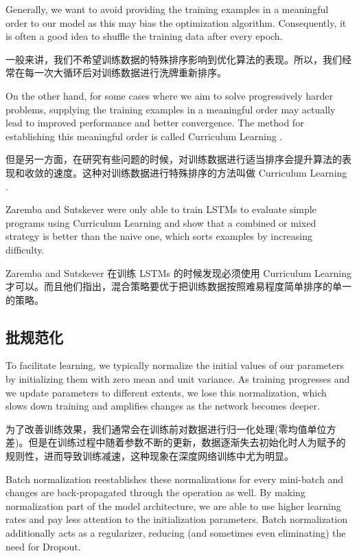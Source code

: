 \documentclass{article}
\begin{document}
Generally, we want to avoid providing the training examples in a meaningful order to our model as this may bias the optimization algorithm. Consequently, it is often a good idea to shuffle the training data after every epoch. 

一般来讲，我们不希望训练数据的特殊排序影响到优化算法的表现。所以，我们经常在每一次大循环后对训练数据进行洗牌重新排序。

On the other hand, for some cases where we aim to solve progressively harder problems, supplying the training examples in a meaningful order may actually lead to improved performance and better convergence. The method for establishing this meaningful order is called Curriculum Learning \cite{Bengio2009a}. 

但是另一方面，在研究有些问题的时候，对训练数据进行适当排序会提升算法的表现和收敛的速度。这种对训练数据进行特殊排序的方法叫做 Curriculum Learning \cite{Bengio2009a}.

Zaremba and Sutskever \cite{Zaremba2014a} were only able to train LSTMs to evaluate simple programs using Curriculum Learning and show that a combined or mixed strategy is better than the naive one, which sorts examples by increasing difficulty.

Zaremba and Sutskever \cite{Zaremba2014a} 在训练 LSTMs 的时候发现必须使用 Curriculum Learning 才可以。而且他们指出，混合策略要优于把训练数据按照难易程度简单排序的单一的策略。

\subsection{批规范化}

To facilitate learning, we typically normalize the initial values of our parameters by initializing them with zero mean and unit variance. As training progresses and we update parameters to different extents, we lose this normalization, which slows down training and amplifies changes as the network becomes deeper.

为了改善训练效果，我们通常会在训练前对数据进行归一化处理(零均值单位方差)。但是在训练过程中随着参数不断的更新，数据逐渐失去初始化时人为赋予的规则性，进而导致训练减速，这种现象在深度网络训练中尤为明显。

Batch normalization \cite{Ioffe2015a} reestablishes these normalizations for every mini-batch and changes are back-propagated through the operation as well. By making normalization part of the model architecture, we are able to use higher learning rates and pay less attention to the initialization parameters. Batch normalization additionally acts as a regularizer, reducing (and sometimes even eliminating) the need for Dropout.
\end{document}
